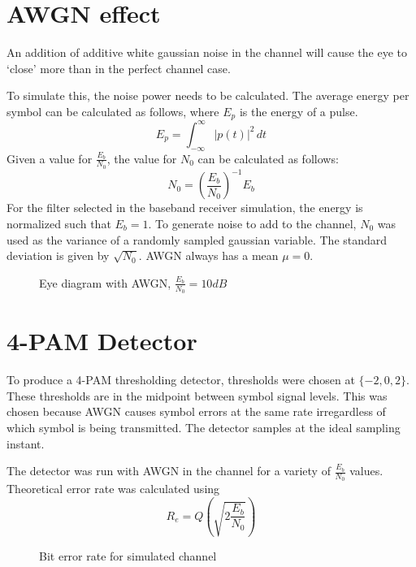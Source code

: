 \documentclass[11pt]{article}
\begin{document}
\section{AWGN effect}
An addition of additive white gaussian noise in the channel will cause the eye
to `close' more than in the perfect channel case.

To simulate this, the noise power needs to be calculated. The average energy per
symbol can be calculated as follows, where $E_p$ is the energy of a pulse.
\begin{equation}
    E_p = \int_{-\infty}^{\infty} |p(t)|^2 \,dt
\end{equation}
Given a value for $\frac{E_b}{N_0}$, the value for $N_0$ can be calculated as follows:
\begin{equation}
    N_0 = \left(\frac{E_b}{N_0} \right)^{-1} E_b
\end{equation}
For the filter selected in the baseband receiver simulation, the energy is
normalized such that $E_b = 1$. To generate noise to add to the channel, $N_0$
was used as the variance of a randomly sampled gaussian variable. The standard
deviation is given by $\sqrt{N_0}$. AWGN always has a mean $\mu = 0$.

\begin{figure}[H]
    \centering
    \scalebox{0.7}{}
    \caption{Eye diagram with AWGN, $\frac{E_b}{N_0} = 10dB$}
\end{figure}

\section{4-PAM Detector}
To produce a 4-PAM thresholding detector, thresholds were chosen at $\{-2, 0,
    2\}$. These thresholds are in the midpoint between symbol signal levels. This
was chosen because AWGN causes symbol errors at the same rate irregardless of
which symbol is being transmitted. The detector samples at the ideal sampling
instant.


The detector was run with AWGN in the channel for a variety of $\frac{E_b}{N_0}$ values. Theoretical error rate was calculated using
\begin{equation}
    R_e = Q\left( \sqrt{2 \frac{E_b}{N_0}}\right)
\end{equation}

\begin{figure}[H]
    \centering
    \scalebox{0.7}{}
    \caption{Bit error rate for simulated channel\label{error}}
\end{figure}
\end{document}
